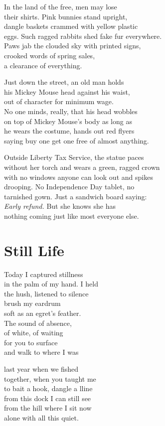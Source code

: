 \documentclass[twoside,10pt]{book}
\begin{document}
In the land of the free, men may lose\\
their shirts. Pink bunnies stand upright,\\
dangle baskets crammed with yellow plastic\\
eggs. Such ragged rabbits shed fake fur everywhere.\\
Paws jab the clouded sky with printed signs,\\
crooked words of spring sales,\\
a clearance of everything.

Just down the street, an old man holds\\
his Mickey Mouse head against his waist,\\
out of character for minimum wage.\\
No one minds, really, that his head wobbles\\
on top of Mickey Mouse's body as long as\\
he wears the costume, hands out red flyers\\
saying buy one get one free of almost anything.

Outside Liberty Tax Service, the statue paces\\
without her torch and wears a green, ragged crown\\
with no windows anyone can look out and spikes\\
drooping. No Independence Day tablet, no\\
tarnished gown. Just a sandwich board saying:\\
\emph{Early refund.} But she knows she has\\
nothing coming just like most everyone else.


\clearpage
\section{Still Life}

Today I captured stillness\\
in the palm of my hand. I held\\
the hush, listened to silence\\
brush my eardrum\\
soft as an egret's feather.\\
The sound of absence,\\
of white, of waiting\\
for you to surface\\
and walk to where I was

last year when we fished\\
together, when you taught me\\
to bait a hook, dangle a lline\\
from this dock I can still see\\
from the hill where I sit now\\
alone with all this quiet.
\end{document}
